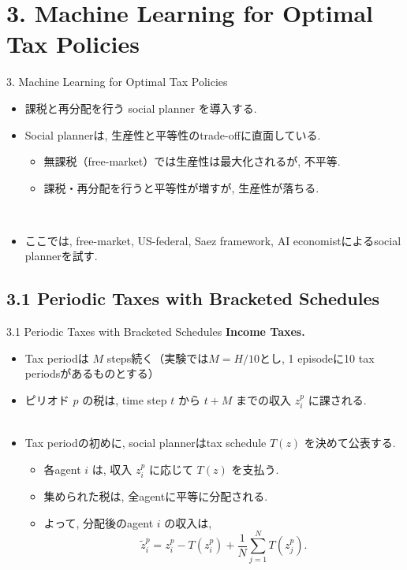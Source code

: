 \documentclass[unicode,aspectratio=169,11pt]{beamer}
\begin{document}
\section{3. Machine Learning for Optimal Tax Policies}
\begin{frame}{3. Machine Learning for Optimal Tax Policies}
    \begin{itemize}
        \item 課税と再分配を行う social planner を導入する.
        \item Social plannerは, 生産性と平等性のtrade-offに直面している.
        \begin{itemize}
            \item 無課税（free-market）では生産性は最大化されるが, 不平等.
            \item 課税・再分配を行うと平等性が増すが, 生産性が落ちる.
        \end{itemize}
        　\\
        \item ここでは, free-market, US-federal, Saez framework, AI economistによるsocial plannerを試す.
    \end{itemize}
\end{frame}

\subsection{3.1 Periodic Taxes with Bracketed Schedules}
\begin{frame}{3.1 Periodic Taxes with Bracketed Schedules}{}
{\bf Income Taxes.}
    \begin{itemize}
        \item Tax periodは $M$ steps続く（実験では$M = H/10$とし, 1 episodeに10 tax periodsがあるものとする）
        \item ピリオド $p$ の税は, time step $t$ から $t + M$ までの収入 $z_i^p$ に課される.\\
                　
        \item Tax periodの初めに, social plannerはtax schedule $T(z)$ を決めて公表する.
        \begin{itemize}
            \item 各agent $i$ は, 収入 $z_i^p$ に応じて $T(z)$ を支払う.
            \item 集められた税は, 全agentに平等に分配される.
            \item よって, 分配後のagent $i$ の収入は,
            \[ \tilde{z}_i^p = z_i^p - T(z_i^p) + \frac{1}{N}\sum_{j=1}^N T\left(z_j^p\right). \tag{5}\]
        \end{itemize}
    \end{itemize}
\end{frame}
\end{document}
